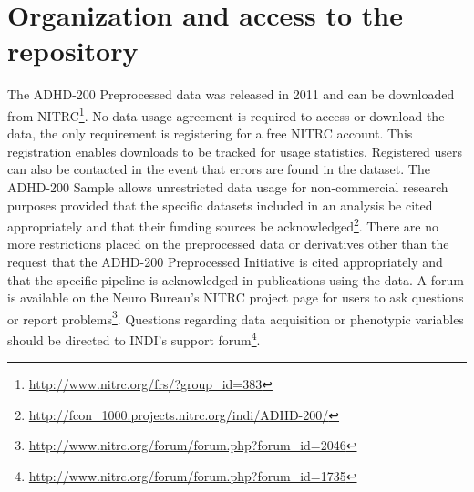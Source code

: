 \documentclass[preprint,12pt,3p]{elsarticle}
\begin{document}


\section{Organization and access to the repository}

The ADHD-200 Preprocessed data was released in 2011 and can be downloaded from NITRC\footnote{\url{http://www.nitrc.org/frs/?group_id=383}}. No data usage agreement is required to access or download the data, the only requirement is registering for a free NITRC account. This registration enables downloads to be tracked for usage statistics. Registered users can also be contacted in the event that errors are found in the dataset. The ADHD-200 Sample allows unrestricted data usage for non-commercial research purposes provided that the specific datasets included in an analysis be cited appropriately and that their funding sources be acknowledged\footnote{\url{http://fcon_1000.projects.nitrc.org/indi/ADHD-200/}}. There are no more restrictions placed on the preprocessed data or derivatives other than the request that the ADHD-200 Preprocessed Initiative is cited appropriately and that the specific pipeline is acknowledged in publications using the data. A forum is available on the Neuro Bureau's NITRC project page for users to ask questions or report problems\footnote{\url{http://www.nitrc.org/forum/forum.php?forum_id=2046}}. Questions regarding data acquisition or phenotypic variables should be directed to INDI's support forum\footnote{\url{http://www.nitrc.org/forum/forum.php?forum_id=1735}}. 
\end{document}
